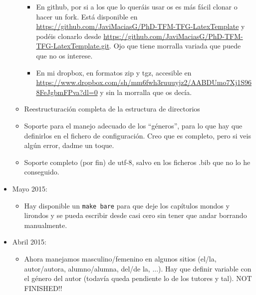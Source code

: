 \documentclass[spanish,openright]{book}
\begin{document}
\begin{appendices}
\begin{itemize}
\begin{itemize}
\begin{itemize}
\item En github, por si a los que lo queráis usar os es más fácil
clonar o hacer un fork. Está disponible en
\url{https://github.com/JaviMaciasG/PhD-TFM-TFG-LatexTemplate} y
podéis clonarlo desde
\url{https://github.com/JaviMaciasG/PhD-TFM-TFG-LatexTemplate.git}. Ojo
que tiene morralla variada que puede que no os interese.
\item En mi dropbox, en formatos zip y tgz, accesible en
\url{https://www.dropbox.com/sh/mm6fwh3ruuuyjz2/AABDUmo7Xj1S968FeJgbmFPva?dl=0}
y sin la morralla que os decía.

\end{itemize}

\item Reestructuración completa de la estructura de directorios
\item Soporte para el manejo adecuado de los ``géneros'', para lo
que hay que definirlos en el fichero de configuración. Creo que es
completo, pero si veis algún error, dadme un toque.
\item Soporte completo (por fin) de utf-8, salvo en los ficheros
.bib que no lo he conseguido.
\end{itemize}

\item Mayo 2015:
\begin{itemize}
\item Hay disponible un \texttt{make bare} para que deje los capítulos
mondos y lirondos y se pueda escribir desde casi cero sin tener que
andar borrando manualmente.
\end{itemize}


\item Abril 2015:
\begin{itemize}
\item Ahora manejamos masculino/femenino en algunos sitios (el/la,
autor/autora, alumno/alumna, del/de la, ...). Hay que definir
variable con el género del autor (todavía queda pendiente lo de los
tutores y tal). NOT FINISHED!!
\end{itemize}



\end{itemize}
\end{appendices}
\end{document}
